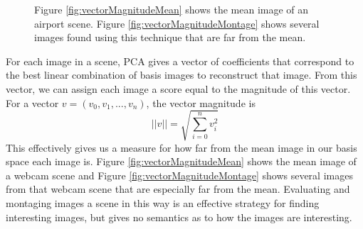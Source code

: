 \begin{figure}
	\centering
		\caption[PCA Basis Coefficient Vector Magnitude.]{Figure \ref{fig:vectorMagnitudeMean} shows the mean image of an airport scene. Figure \ref{fig:vectorMagnitudeMontage} shows several images found using this technique that are far from the mean.}
\end{figure}

For each image in a scene, PCA gives a vector of coefficients that correspond to the best linear combination of basis images to reconstruct that image.  From this vector, we can assign each image a score equal to the magnitude of this vector.  For a vector $v = (v_0, v_1, ..., v_n)$, the vector magnitude is $$||v||=\sqrt{\sum_{i=0}^nv_i^2}$$This effectively gives us a measure for how far from the mean image in our basis space each image is.  Figure \ref{fig:vectorMagnitudeMean} shows the mean image of a webcam scene and Figure \ref{fig:vectorMagnitudeMontage} shows several images from that webcam scene that are especially far from the mean.  Evaluating and montaging images a scene in this way is an effective strategy for finding interesting images, but gives no semantics as to how the images are interesting.

